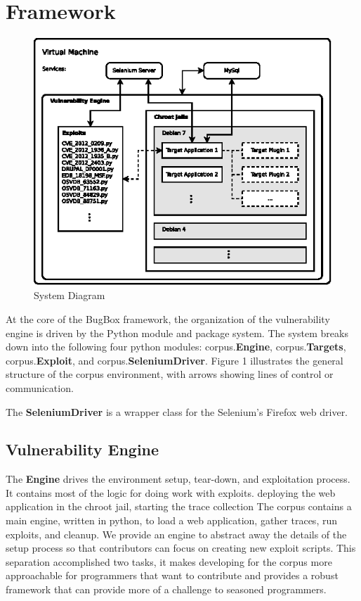 \documentclass[letterpaper,twocolumn,10pt]{article}
\begin{document}
\section{Framework}

\begin{figure}[!tp]
\begin{center}
\includegraphics[scale=1.10]{system_diagram.eps}
\end{center}
\caption{System Diagram}
\end{figure}

At the core of the BugBox framework, the organization of the vulnerability engine is driven by the Python module and package system. The system breaks down into the following four python modules: corpus.{\bf Engine}, corpus.{\bf Targets}, corpus.{\bf Exploit}, and corpus.{\bf SeleniumDriver}.
Figure 1 illustrates the general structure of the corpus environment, with arrows showing lines of control or communication.  
   


  The {\bf SeleniumDriver} is a wrapper class for the Selenium's Firefox web driver.



\subsection{Vulnerability Engine}
The {\bf Engine} drives the environment setup, tear-down, and exploitation process. It contains most of the logic for doing work with exploits.
deploying the web application in the chroot jail, starting the trace collection
The corpus contains a main engine, written in python, to load a web application, gather traces, run exploits, and cleanup.  We provide an engine to abstract away the details of the setup process so that contributors can focus on creating new exploit scripts.  This separation accomplished two tasks, it makes developing for the corpus more approachable for programmers that want to contribute and provides a robust framework that can provide more of a challenge to seasoned programmers.
\end{document}
